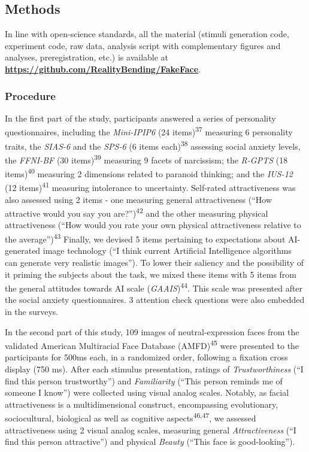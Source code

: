 \documentclass[
  man,floatsintext]{apa6}
\begin{document}
\hypertarget{methods}{%
\subsection{Methods}\label{methods}}

In line with open-science standards, all the material (stimuli generation code, experiment code, raw data, analysis script with complementary figures and analyses, preregistration, etc.) is available at \href{https://github.com/RealityBending/FakeFace}{\textbf{https://github.com/RealityBending/FakeFace}}.

\hypertarget{procedure}{%
\subsubsection{Procedure}\label{procedure}}

In the first part of the study, participants answered a series of personality questionnaires, including the \emph{Mini-IPIP6}
(24 items)\textsuperscript{37}
measuring 6 personality traits, the \emph{SIAS-6} and the \emph{SPS-6}
(6 items each)\textsuperscript{38}
assessing social anxiety levels, the \emph{FFNI-BF}
(30 items)\textsuperscript{39}
measuring 9 facets of narcissism; the \emph{R-GPTS}
(18 items)\textsuperscript{40}
measuring 2 dimensions related to paranoid thinking; and the \emph{IUS-12}
(12 items)\textsuperscript{41}
measuring intolerance to uncertainty. Self-rated attractiveness was also assessed using 2 items - one measuring general attractiveness
(``How attractive would you say you are?'')\textsuperscript{42}
and the other measuring physical attractiveness
(``How would you rate your own physical attractiveness relative to the average'')\textsuperscript{43}
Finally, we devised 5 items pertaining to expectations about AI-generated image technology (``I think current Artificial Intelligence algorithms can generate very realistic images''). To lower their saliency and the possibility of it priming the subjects about the task, we mixed these items with 5 items from the general attitudes towards AI scale
(\emph{GAAIS})\textsuperscript{44}.
This scale was presented after the social anxiety questionnaires. 3 attention check questions were also embedded in the surveys.

In the second part of this study, 109 images of neutral-expression faces from the validated American Multiracial Face Database
(AMFD)\textsuperscript{45}
were presented to the participants for 500ms each, in a randomized order, following a fixation cross display (750 ms). After each stimulus presentation, ratings of \emph{Trustworthiness} (``I find this person trustworthy'') and \emph{Familiarity} (``This person reminds me of someone I know'') were collected using visual analog scales. Notably, as facial attractiveness is a multidimensional construct, encompassing evolutionary, sociocultural, biological as well as cognitive aspects\textsuperscript{46,47}, we assessed attractiveness using 2 visual analog scales, measuring general \emph{Attractiveness} (``I find this person attractive'') and physical \emph{Beauty} (``This face is good-looking'').
\end{document}
